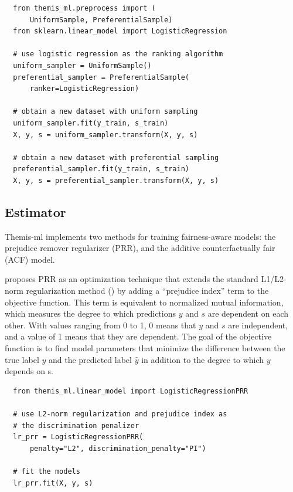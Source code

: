 \documentclass[man,natbib]{apa6}
\begin{document}
\begin{verbatim}
  from themis_ml.preprocess import (
      UniformSample, PreferentialSample)
  from sklearn.linear_model import LogisticRegression

  # use logistic regression as the ranking algorithm
  uniform_sampler = UniformSample()
  preferential_sampler = PreferentialSample(
      ranker=LogisticRegression)

  # obtain a new dataset with uniform sampling
  uniform_sampler.fit(y_train, s_train)
  X, y, s = uniform_sampler.transform(X, y, s)

  # obtain a new dataset with preferential sampling
  preferential_sampler.fit(y_train, s_train)
  X, y, s = preferential_sampler.transform(X, y, s)
\end{verbatim}

\subsection{Estimator}

Themis-ml implements two methods for training fairness-aware models: the
prejudice remover regularizer (PRR), and the additive counterfactually fair
(ACF) model.

\cite{kamishima2012fairness} proposes PRR as an optimization technique that
extends the standard L1/L2-norm regularization method (\citealp{ng2004feature,
ribeiro2016should}) by adding a ``prejudice index'' term to the objective function.
This term is equivalent to normalized mutual information, which measures the
degree to which predictions \(y\) and \(s\) are dependent on each other. With
values ranging from 0 to 1, 0 means that \(y\) and \(s\) are independent, and a
value of 1 means that they are dependent. The goal of the objective function is
to find model parameters that minimize the difference between the true label
\(y\) and the predicted label \(\hat{y}\) in addition to the degree to which
\(y\) depends on s.

\begin{verbatim}
  from themis_ml.linear_model import LogisticRegressionPRR

  # use L2-norm regularization and prejudice index as
  # the discrimination penalizer
  lr_prr = LogisticRegressionPRR(
      penalty="L2", discrimination_penalty="PI")

  # fit the models
  lr_prr.fit(X, y, s)
\end{verbatim}
\end{document}
